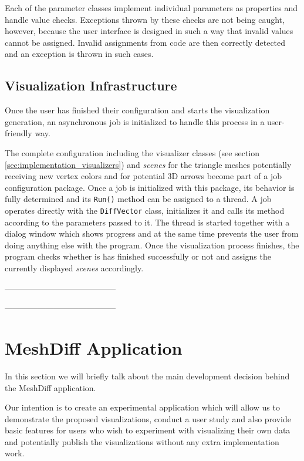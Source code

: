 Each of the parameter classes implement individual parameters as properties and handle value checks. Exceptions thrown by these checks are not being caught, however, because the user interface is designed in such a way that invalid values cannot be assigned. Invalid assignments from code are then correctly detected and an exception is thrown in such cases.
\subsection{Visualization Infrastructure}

Once the user has finished their configuration and starts the visualization generation, an asynchronous job is initialized to handle this process in a user-friendly way.

The complete configuration including the visualizer classes (see section \ref{sec:implementation_visualizers}) and {\it scenes} for the triangle meshes potentially receiving new vertex colors and for potential 3D arrows become part of a job configuration package. Once a job is initialized with this package, its behavior is fully determined and its \verb+Run()+ method can be assigned to a thread. A job operates directly with the \verb+DiffVector+ class, initializes it and calls its method according to the parameters passed to it. The thread is started together with a dialog window which shows progress and at the same time prevents the user from doing anything else with the program. Once the visualization process finishes, the program checks whether is has finished successfully or not and assigns the currently displayed {\it scenes} accordingly.

-----------------------------------------

-----------------------------------------
\section{MeshDiff Application}

In this section we will briefly talk about the main development decision behind the MeshDiff application.

Our intention is to create an experimental application which will allow us to demonstrate the proposed visualizations, conduct a user study and also provide basic features for users who wish to experiment with visualizing their own data and potentially publish the visualizations without any extra implementation work.

